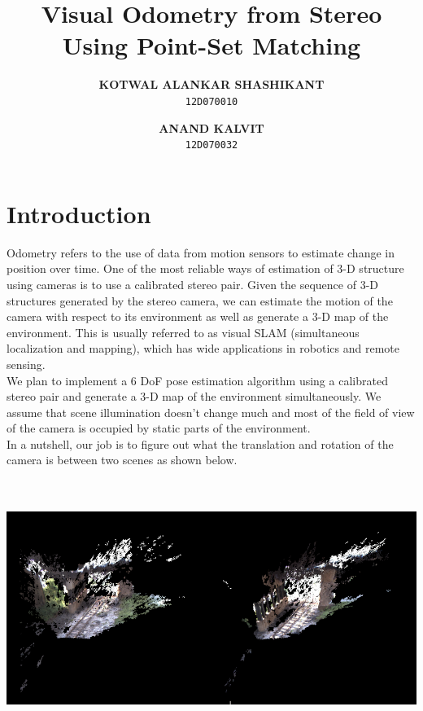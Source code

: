 \documentclass[11pt, a4paper]{article}
\author{
  \textbf{KOTWAL ALANKAR SHASHIKANT}\\
  \texttt{12D070010}
  \and
  \textbf{ANAND KALVIT}\\
  \texttt{12D070032}
}
\title{Visual Odometry from Stereo Using Point-Set Matching}
\begin{document}
\maketitle
\newpage

\section{Introduction}
Odometry refers to the use of data from motion sensors to estimate change in position over time. One of the most reliable ways of estimation of 3-D structure using cameras is to use a calibrated stereo pair. Given the sequence of 3-D structures generated by the stereo camera, we can estimate the motion of the camera with respect to its environment as well as generate a 3-D map of the environment. This is usually referred to as visual SLAM (simultaneous localization and mapping), which has wide applications in robotics and remote sensing. \\

\noindent We plan to implement a 6 DoF pose estimation algorithm using a calibrated stereo pair and generate a 3-D map of the environment simultaneously. We assume that scene illumination doesn't change much and most of the field of view of the camera is occupied by static parts of the environment. \\

\noindent In a nutshell, our job is to figure out what the translation and rotation of the camera is between two scenes as shown below. \\ \\ \\
\centerline{\includegraphics[scale=0.50]{pointclouds}}
\newpage
\end{document}
